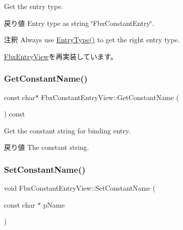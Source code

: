 Get the entry type. \begin{DoxyReturn}{戻り値}
Entry type as string \char`\"{}\+Fbx\+Constant\+Entry\char`\"{}. 
\end{DoxyReturn}
\begin{DoxyRemark}{注釈}
Always use \hyperlink{class_fbx_constant_entry_view_a7ea7fc9df5e1316854d18ffcc797e564}{Entry\+Type()} to get the right entry type. 
\end{DoxyRemark}


\hyperlink{class_fbx_entry_view_a83ee50482b441ba8b0e6d7c2dba5432f}{Fbx\+Entry\+View}を再実装しています。

\mbox{\label{class_fbx_constant_entry_view_a5e61786ae363b4281f5515e225722700}} 
\subsubsection{\texorpdfstring{Get\+Constant\+Name()}{GetConstantName()}}
{\footnotesize\ttfamily const char$\ast$ Fbx\+Constant\+Entry\+View\+::\+Get\+Constant\+Name (\begin{DoxyParamCaption}{ }\end{DoxyParamCaption}) const}

Get the constant string for binding entry. \begin{DoxyReturn}{戻り値}
The constant string. 
\end{DoxyReturn}
\mbox{\label{class_fbx_constant_entry_view_abe9370dc86bcdfb7b9ef617d2317f4b2}} 
\subsubsection{\texorpdfstring{Set\+Constant\+Name()}{SetConstantName()}}
{\footnotesize\ttfamily void Fbx\+Constant\+Entry\+View\+::\+Set\+Constant\+Name (\begin{DoxyParamCaption}\item[{const char $\ast$}]{p\+Name }\end{DoxyParamCaption})}

